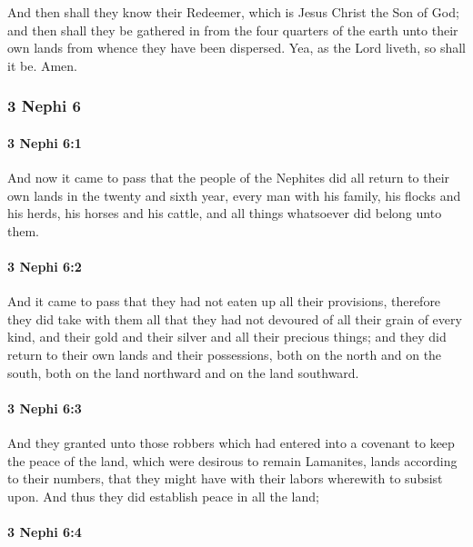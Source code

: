 			And then shall they know their Redeemer,
			which is Jesus Christ the Son of God;
			and then shall they be gathered in from the four quarters of the earth
			unto their own lands from whence they have been dispersed.
			Yea, as the Lord liveth, so shall it be.
			Amen.

	\subsubsection{3 Nephi 6} %
		\label{3NEPHI-6}
		
		\paragraph{3 Nephi 6:1} %
			\label{3NEPHI-6-1}

			And now it came to pass that
			the people of the Nephites did all return to their own lands
			in the twenty and sixth year,
			every man with his family, his flocks and his herds, his horses and his cattle,
			and all things whatsoever did belong unto them.

		\paragraph{3 Nephi 6:2} %
			\label{3NEPHI-6-2}

			And it came to pass that they had not eaten up all their provisions,
			therefore they did take with them
			all that they had not devoured of all their grain of every kind,
			and their gold and their silver and all their precious things;
			and they did return to their own lands and their possessions,
			both on the north and on the south,
			both on the land northward and on the land southward.

		\paragraph{3 Nephi 6:3} %
			\label{3NEPHI-6-3}

			And they granted unto those robbers
			which had entered into a covenant to keep the peace of the land,
			which were desirous to remain Lamanites,
			lands according to their numbers,
			that they might have with their labors wherewith to subsist upon.
			And thus they did establish peace in all the land;

		\paragraph{3 Nephi 6:4} %
			\label{3NEPHI-6-4}

